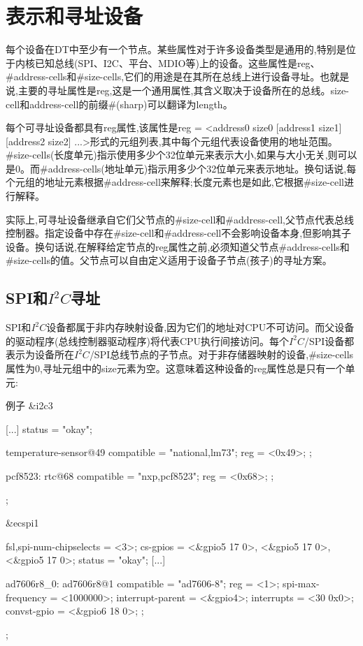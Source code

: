 \documentclass[lang=cn,newtx,10pt,scheme=chinese]{elegantbook}
\begin{document}
\section{表示和寻址设备}

每个设备在DT中至少有一个节点。某些属性对于许多设备类型是通用的,特别是位于内核已知总线(SPI、I2C、平台、MDIO等)上的设备。这些属性是reg、\#address-cells和\#size-cells,它们的用途是在其所在总线上进行设备寻址。也就是说,主要的寻址属性是reg,这是一个通用属性,其含义取决于设备所在的总线。size-cell和address-cell的前缀\#(sharp)可以翻译为length。

每个可寻址设备都具有reg属性,该属性是reg = <address0 size0 [address1 size1] [address2 size2] ...>形式的元组列表,其中每个元组代表设备使用的地址范围。\#size-cells(长度单元)指示使用多少个32位单元来表示大小,如果与大小无关,则可以是0。而\#address-cells(地址单元)指示用多少个32位单元来表示地址。换句话说,每个元组的地址元素根据\#address-cell来解释;长度元素也是如此,它根据\#size-cell进行解释。

实际上,可寻址设备继承自它们父节点的\#size-cell和\#address-cell,父节点代表总线控制器。指定设备中存在\#size-cell和\#address-cell不会影响设备本身,但影响其子设备。换句话说,在解释给定节点的reg属性之前,必须知道父节点\#address-cells和\#size-cells的值。父节点可以自由定义适用于设备子节点(孩子)的寻址方案。

\subsection{SPI和$I^2C$寻址}

SPI和$I^2C$设备都属于非内存映射设备,因为它们的地址对CPU不可访问。而父设备的驱动程序(总线控制器驱动程序)将代表CPU执行间接访问。每个$I^2C$/SPI设备都表示为设备所在$I^2C$/SPI总线节点的子节点。对于非存储器映射的设备,\#size-cells属性为0,寻址元组中的size元素为空。这意味着这种设备的reg属性总是只有一个单元:

\begin{mycode}{例子}
&i2c3 {
    [...]
    status = "okay";

    temperature-sensor@49 {
        compatible = "national,lm73";
        reg = <0x49>;
    };

    pcf8523: rtc@68 {
        compatible = "nxp,pcf8523";
        reg = <0x68>;
    };
};

&ecspi1 {
    fsl,spi-num-chipselects = <3>;
    cs-gpios = <&gpio5 17 0>, <&gpio5 17 0>, <&gpio5 17 0>;
    status = "okay";
    [...]

    ad7606r8_0: ad7606r8@1 {
        compatible = "ad7606-8";
        reg = <1>;
        spi-max-frequency = <1000000>;
        interrupt-parent = <&gpio4>;
        interrupts = <30 0x0>;
        convst-gpio = <&gpio6 18 0>;
    };
};
\end{mycode}
\end{document}
